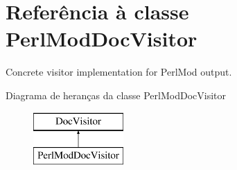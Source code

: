 \hypertarget{class_perl_mod_doc_visitor}{\section{Referência à classe Perl\-Mod\-Doc\-Visitor}
\label{class_perl_mod_doc_visitor}
}


Concrete visitor implementation for Perl\-Mod output.  


Diagrama de heranças da classe Perl\-Mod\-Doc\-Visitor\begin{figure}[H]
\begin{center}
\leavevmode
\includegraphics[height=2.000000cm]{class_perl_mod_doc_visitor}
\end{center}
\end{figure}
